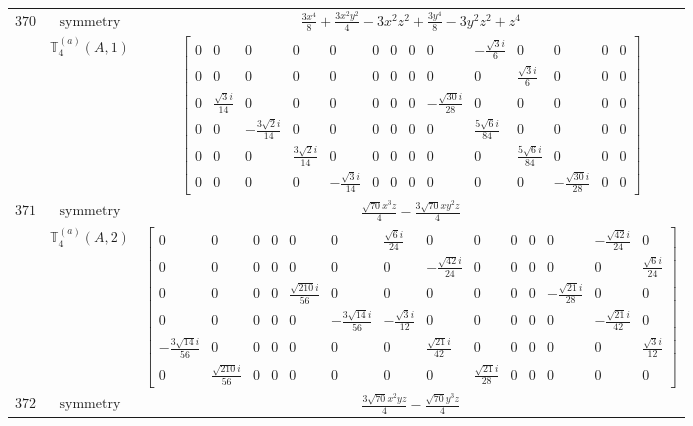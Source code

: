 \documentclass[fleqn,8pt,landscape]{jsarticle}
\begin{document}
\begin{longtable}{ccc}
$ 370 $ & $ \text{symmetry} $ & $ \frac{3 x^{4}}{8} + \frac{3 x^{2} y^{2}}{4} - 3 x^{2} z^{2} + \frac{3 y^{4}}{8} - 3 y^{2} z^{2} + z^{4} $ \\
$  $ & $ \mathbb{T}_{4}^{(a)}(A,1) $ & $ \begin{bmatrix} 0 & 0 & 0 & 0 & 0 & 0 & 0 & 0 & 0 & - \frac{\sqrt{3} i}{6} & 0 & 0 & 0 & 0 \\ 0 & 0 & 0 & 0 & 0 & 0 & 0 & 0 & 0 & 0 & \frac{\sqrt{3} i}{6} & 0 & 0 & 0 \\ 0 & \frac{\sqrt{3} i}{14} & 0 & 0 & 0 & 0 & 0 & 0 & - \frac{\sqrt{30} i}{28} & 0 & 0 & 0 & 0 & 0 \\ 0 & 0 & - \frac{3 \sqrt{2} i}{14} & 0 & 0 & 0 & 0 & 0 & 0 & \frac{5 \sqrt{6} i}{84} & 0 & 0 & 0 & 0 \\ 0 & 0 & 0 & \frac{3 \sqrt{2} i}{14} & 0 & 0 & 0 & 0 & 0 & 0 & \frac{5 \sqrt{6} i}{84} & 0 & 0 & 0 \\ 0 & 0 & 0 & 0 & - \frac{\sqrt{3} i}{14} & 0 & 0 & 0 & 0 & 0 & 0 & - \frac{\sqrt{30} i}{28} & 0 & 0 \end{bmatrix} $ \\ \hline
$ 371 $ & $ \text{symmetry} $ & $ \frac{\sqrt{70} x^{3} z}{4} - \frac{3 \sqrt{70} x y^{2} z}{4} $ \\
$  $ & $ \mathbb{T}_{4}^{(a)}(A,2) $ & $ \begin{bmatrix} 0 & 0 & 0 & 0 & 0 & 0 & \frac{\sqrt{6} i}{24} & 0 & 0 & 0 & 0 & 0 & - \frac{\sqrt{42} i}{24} & 0 \\ 0 & 0 & 0 & 0 & 0 & 0 & 0 & - \frac{\sqrt{42} i}{24} & 0 & 0 & 0 & 0 & 0 & \frac{\sqrt{6} i}{24} \\ 0 & 0 & 0 & 0 & \frac{\sqrt{210} i}{56} & 0 & 0 & 0 & 0 & 0 & 0 & - \frac{\sqrt{21} i}{28} & 0 & 0 \\ 0 & 0 & 0 & 0 & 0 & - \frac{3 \sqrt{14} i}{56} & - \frac{\sqrt{3} i}{12} & 0 & 0 & 0 & 0 & 0 & - \frac{\sqrt{21} i}{42} & 0 \\ - \frac{3 \sqrt{14} i}{56} & 0 & 0 & 0 & 0 & 0 & 0 & \frac{\sqrt{21} i}{42} & 0 & 0 & 0 & 0 & 0 & \frac{\sqrt{3} i}{12} \\ 0 & \frac{\sqrt{210} i}{56} & 0 & 0 & 0 & 0 & 0 & 0 & \frac{\sqrt{21} i}{28} & 0 & 0 & 0 & 0 & 0 \end{bmatrix} $ \\ \hline
$ 372 $ & $ \text{symmetry} $ & $ \frac{3 \sqrt{70} x^{2} y z}{4} - \frac{\sqrt{70} y^{3} z}{4} $ \\

\end{longtable}
\end{document}
